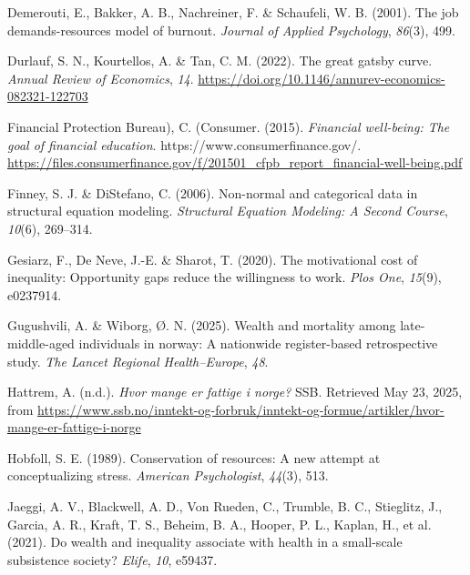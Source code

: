 \documentclass[
  12pt,
  a4paper,
  DIV=11,
  numbers=noendperiod]{scrartcl}
\newlength{\cslhangindent}
\newenvironment{CSLReferences}[2] %
 {\begin{list}{}{%
  \setlength{\itemindent}{0pt}
  \setlength{\leftmargin}{0pt}
  \setlength{\parsep}{0pt}
  \ifodd #1
   \setlength{\leftmargin}{\cslhangindent}
   \setlength{\itemindent}{-1\cslhangindent}
  \fi
  \setlength{\itemsep}{#2\baselineskip}}}
 {\end{list}}
\begin{document}
\label{refs}
\begin{CSLReferences}{1}{0}
Demerouti, E., Bakker, A. B., Nachreiner, F. \& Schaufeli, W. B. (2001).
The job demands-resources model of burnout. \emph{Journal of Applied
Psychology}, \emph{86}(3), 499.

Durlauf, S. N., Kourtellos, A. \& Tan, C. M. (2022). The great gatsby
curve. \emph{Annual Review of Economics}, \emph{14}.
\url{https://doi.org/10.1146/annurev-economics-082321-122703}

Financial Protection Bureau), C. (Consumer. (2015). \emph{Financial
well-being: The goal of financial education}.
https://www.consumerfinance.gov/.
\url{https://files.consumerfinance.gov/f/201501_cfpb_report_financial-well-being.pdf}

Finney, S. J. \& DiStefano, C. (2006). Non-normal and categorical data
in structural equation modeling. \emph{Structural Equation Modeling: A
Second Course}, \emph{10}(6), 269--314.

Gesiarz, F., De Neve, J.-E. \& Sharot, T. (2020). The motivational cost
of inequality: Opportunity gaps reduce the willingness to work.
\emph{Plos One}, \emph{15}(9), e0237914.

Gugushvili, A. \& Wiborg, Ø. N. (2025). Wealth and mortality among
late-middle-aged individuals in norway: A nationwide register-based
retrospective study. \emph{The Lancet Regional Health--Europe},
\emph{48}.

Hattrem, A. (n.d.). \emph{Hvor mange er fattige i norge?} SSB. Retrieved
May 23, 2025, from
\url{https://www.ssb.no/inntekt-og-forbruk/inntekt-og-formue/artikler/hvor-mange-er-fattige-i-norge}

Hobfoll, S. E. (1989). Conservation of resources: A new attempt at
conceptualizing stress. \emph{American Psychologist}, \emph{44}(3), 513.

Jaeggi, A. V., Blackwell, A. D., Von Rueden, C., Trumble, B. C.,
Stieglitz, J., Garcia, A. R., Kraft, T. S., Beheim, B. A., Hooper, P.
L., Kaplan, H., et al. (2021). Do wealth and inequality associate with
health in a small-scale subsistence society? \emph{Elife}, \emph{10},
e59437.


\end{CSLReferences}
\end{document}
